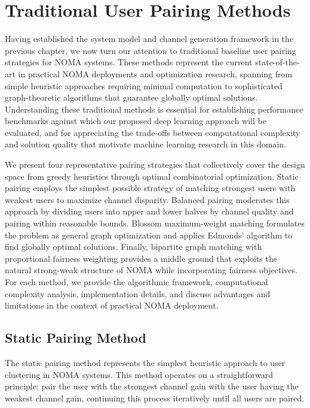 \chapter{Traditional User Pairing Methods}
\label{chap:traditional}

Having established the system model and channel generation framework in the previous chapter, we now turn our attention to traditional baseline user pairing strategies for NOMA systems. These methods represent the current state-of-the-art in practical NOMA deployments and optimization research, spanning from simple heuristic approaches requiring minimal computation to sophisticated graph-theoretic algorithms that guarantee globally optimal solutions. Understanding these traditional methods is essential for establishing performance benchmarks against which our proposed deep learning approach will be evaluated, and for appreciating the trade-offs between computational complexity and solution quality that motivate machine learning research in this domain.

We present four representative pairing strategies that collectively cover the design space from greedy heuristics through optimal combinatorial optimization. Static pairing employs the simplest possible strategy of matching strongest users with weakest users to maximize channel disparity. Balanced pairing moderates this approach by dividing users into upper and lower halves by channel quality and pairing within reasonable bounds. Blossom maximum-weight matching formulates the problem as general graph optimization and applies Edmonds' algorithm to find globally optimal solutions. Finally, bipartite graph matching with proportional fairness weighting provides a middle ground that exploits the natural strong-weak structure of NOMA while incorporating fairness objectives. For each method, we provide the algorithmic framework, computational complexity analysis, implementation details, and discuss advantages and limitations in the context of practical NOMA deployment.

\section{Static Pairing Method}

The static pairing method represents the simplest heuristic approach to user clustering in NOMA systems. This method operates on a straightforward principle: pair the user with the strongest channel gain with the user having the weakest channel gain, continuing this process iteratively until all users are paired.

